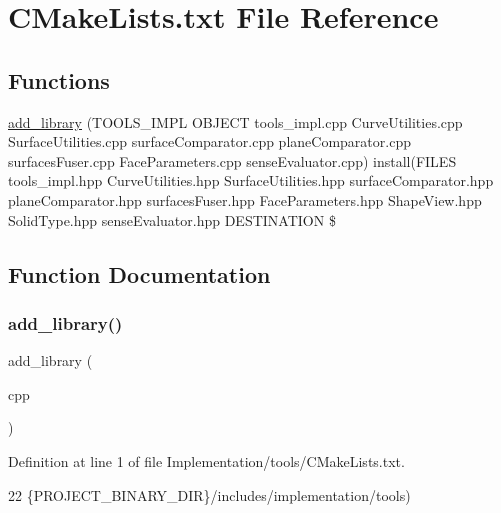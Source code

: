 \hypertarget{Implementation_2tools_2CMakeLists_8txt}{}\section{C\+Make\+Lists.\+txt File Reference}
\label{Implementation_2tools_2CMakeLists_8txt}
\subsection*{Functions}
\begin{DoxyCompactItemize}
\item 
\hyperlink{Implementation_2tools_2CMakeLists_8txt_aa3498489107cab085de698603a2b3bd8}{add\+\_\+library} (T\+O\+O\+L\+S\+\_\+\+I\+M\+PL O\+B\+J\+E\+CT tools\+\_\+impl.\+cpp Curve\+Utilities.\+cpp Surface\+Utilities.\+cpp surface\+Comparator.\+cpp plane\+Comparator.\+cpp surfaces\+Fuser.\+cpp Face\+Parameters.\+cpp sense\+Evaluator.\+cpp) install(F\+I\+L\+ES tools\+\_\+impl.\+hpp Curve\+Utilities.\+hpp Surface\+Utilities.\+hpp surface\+Comparator.\+hpp plane\+Comparator.\+hpp surfaces\+Fuser.\+hpp Face\+Parameters.\+hpp Shape\+View.\+hpp Solid\+Type.\+hpp sense\+Evaluator.\+hpp D\+E\+S\+T\+I\+N\+A\+T\+I\+ON \$
\end{DoxyCompactItemize}


\subsection{Function Documentation}
\mbox{\label{Implementation_2tools_2CMakeLists_8txt_aa3498489107cab085de698603a2b3bd8}} 
\subsubsection{\texorpdfstring{add\+\_\+library()}{add\_library()}}
{\footnotesize\ttfamily add\+\_\+library (\begin{DoxyParamCaption}\item[{T\+O\+O\+L\+S\+\_\+\+I\+M\+PL O\+B\+J\+E\+CT tools\+\_\+impl.\+cpp Curve\+Utilities.\+cpp Surface\+Utilities.\+cpp surface\+Comparator.\+cpp plane\+Comparator.\+cpp surfaces\+Fuser.\+cpp Face\+Parameters.\+cpp sense\+Evaluator.}]{cpp }\end{DoxyParamCaption})}



Definition at line 1 of file Implementation/tools/\+C\+Make\+Lists.\+txt.


\begin{DoxyCode}
22                \{PROJECT\_BINARY\_DIR\}/includes/implementation/tools)
\end{DoxyCode}
